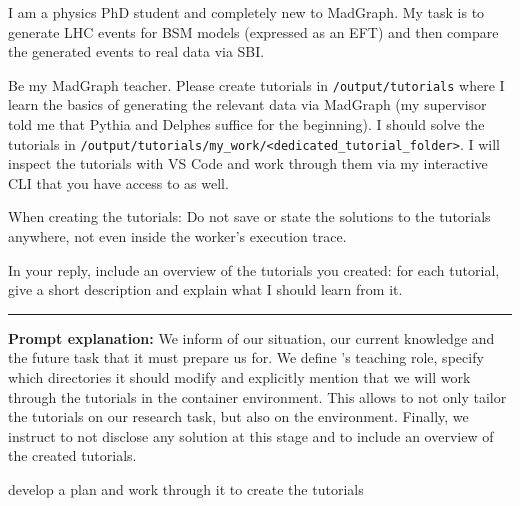 \documentclass[submission, Phys]{SciPost}
\begin{document}
\begin{userblock}[User]
I am a physics PhD student and completely new to MadGraph. My task is to generate LHC events for BSM models (expressed as an EFT) and then compare the generated events to real data via SBI.

Be my MadGraph teacher. Please create tutorials in \lstinline|/output/tutorials| where I learn the basics of generating the relevant data via MadGraph (my supervisor told me that Pythia and Delphes suffice for the beginning). I should solve the tutorials in \lstinline|/output/tutorials/my_work/<dedicated_tutorial_folder>|. I will inspect the tutorials with VS Code and work through them via my interactive CLI that you have access to as well.

When creating the tutorials: Do not save or state the solutions to the tutorials anywhere, not even inside the worker's execution trace.

In your reply, include an overview of the tutorials you created: for each tutorial, give a short description and explain what I should learn from it.

\vspace{1em}
\hrule
\vspace{1em}

\textbf{Prompt explanation:} We inform \ma of our situation, our current knowledge and the future task that it must prepare us for. We define \ma's teaching role, specify which directories it should modify and explicitly mention that we will work through the tutorials in the container environment. This allows \ma to not only tailor the tutorials on our research task, but also on the environment. Finally, we instruct \ma to not disclose any solution at this stage and to include an overview of the created tutorials.
\end{userblock}
%
\ma develop a plan and work through it to create the tutorials
%
\end{document}

